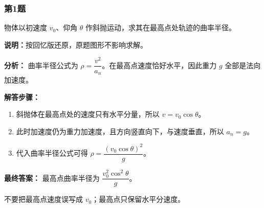 \documentclass[12pt,a4paper]{ctexart}
\begin{document}
\subsubsection*{第1题}
\begin{tcolorbox}[colback=gray!2!white,colframe=black!60,title={题目}]
物体以初速度 \(v_0\)、仰角 \(\theta\) 作斜抛运动，求其在最高点处轨迹的曲率半径。\par
\vspace{0.4em}
\textbf{说明：}按回忆版还原，原题图形不影响求解。\par
\end{tcolorbox}
\begin{tcolorbox}[colback=blue!2!white,colframe=blue!55!black,title={完整答案}]
\textbf{分析：}
曲率半径公式为 \(\rho=\dfrac{v^2}{a_n}\)。在最高点速度恰好水平，因此重力 \(g\) 全部是法向加速度。\par
\textbf{解答步骤：}
\begin{enumerate}
\item 斜抛体在最高点处的速度只有水平分量，所以 \(v=v_0\cos\theta\)。
\item 此时加速度仍为重力加速度，且方向竖直向下，与速度垂直，所以 \(a_n=g\)。
\item 代入曲率半径公式可得 \(\rho=\dfrac{(v_0\cos\theta)^2}{g}\)。
\end{enumerate}
\textbf{最终答案：}
最高点曲率半径为 \(\dfrac{v_0^2\cos^2\theta}{g}\)。\par
\end{tcolorbox}
\begin{tcolorbox}[colback=red!2!white,colframe=red!55!black,title={易错点}]
不要把最高点速度误写成 \(v_0\)；最高点只保留水平分速度。\par
\end{tcolorbox}
\end{document}
